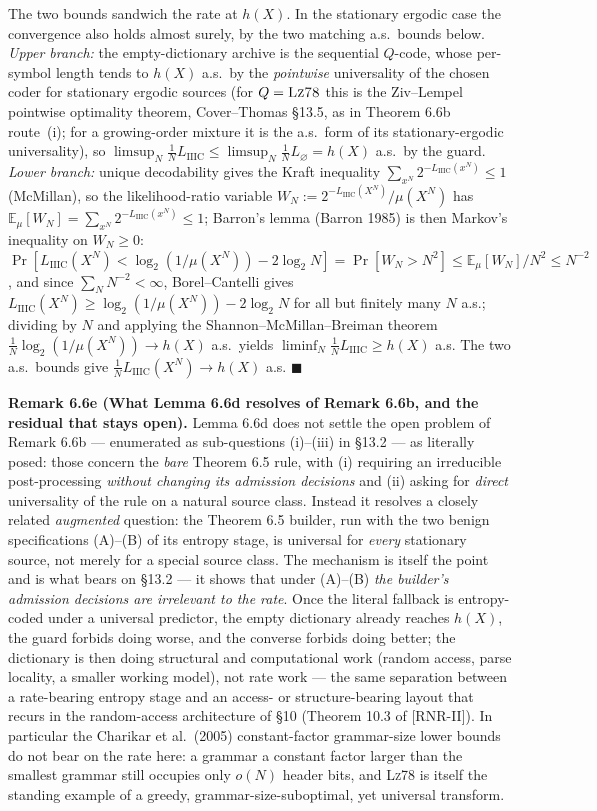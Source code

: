 \documentclass[
]{article}
\begin{document}
The two bounds sandwich the rate at $h(X)$. In the stationary ergodic
case the convergence also holds almost surely, by the two matching a.s.\
bounds below. \emph{Upper branch:} the empty-dictionary archive is the
sequential $Q$-code, whose per-symbol length tends to $h(X)$ a.s.\ by the
\emph{pointwise} universality of the chosen coder for stationary ergodic
sources (for $Q = \textsc{Lz78}$ this is the Ziv--Lempel pointwise
optimality theorem, Cover--Thomas \S13.5, as in Theorem 6.6b route~(i);
for a growing-order mixture it is the a.s.\ form of its
stationary-ergodic universality),
so $\limsup_N \tfrac1N L_{\mathrm{IIIC}} \le \limsup_N \tfrac1N
L_\varnothing = h(X)$ a.s.\ by the guard. \emph{Lower branch:} unique
decodability gives the Kraft inequality $\sum_{x^N}
2^{-L_{\mathrm{IIIC}}(x^N)} \le 1$ (McMillan), so the likelihood-ratio
variable $W_N := 2^{-L_{\mathrm{IIIC}}(X^N)}/\mu(X^N)$ has
$\mathbb{E}_\mu[W_N] = \sum_{x^N} 2^{-L_{\mathrm{IIIC}}(x^N)} \le 1$;
Barron's lemma (Barron 1985) is then Markov's inequality on $W_N \ge 0$:
$\Pr[L_{\mathrm{IIIC}}(X^N) < \log_2(1/\mu(X^N)) - 2\log_2 N] =
\Pr[W_N > N^2] \le \mathbb{E}_\mu[W_N]/N^2 \le N^{-2}$, and since
$\sum_N N^{-2} < \infty$, Borel--Cantelli gives $L_{\mathrm{IIIC}}(X^N)
\ge \log_2(1/\mu(X^N)) - 2\log_2 N$ for all but finitely many $N$ a.s.;
dividing by $N$ and applying the Shannon--McMillan--Breiman theorem
$\tfrac1N \log_2(1/\mu(X^N)) \to h(X)$ a.s.\ yields $\liminf_N \tfrac1N
L_{\mathrm{IIIC}} \ge h(X)$ a.s. The two a.s.\ bounds give $\tfrac1N
L_{\mathrm{IIIC}}(X^N) \to h(X)$ a.s. \hfill$\blacksquare$

\textbf{Remark 6.6e (What Lemma 6.6d resolves of Remark 6.6b, and the
residual that stays open).} Lemma 6.6d does not settle the
open problem of Remark 6.6b --- enumerated as sub-questions (i)--(iii) in
\S13.2 --- as literally posed: those concern the \emph{bare} Theorem 6.5
rule, with (i) requiring an irreducible post-processing \emph{without
changing its admission decisions} and (ii) asking for \emph{direct}
universality of the rule on a natural source class. Instead it resolves a
closely related \emph{augmented} question: the Theorem 6.5 builder, run
with the two benign specifications (A)--(B) of its entropy stage, is
universal for \emph{every} stationary source, not merely for a special
source class. The mechanism is itself the point and is what bears on
\S13.2 --- it shows that under (A)--(B) \emph{the builder's admission
decisions are irrelevant to the rate}. Once the literal fallback is entropy-coded under a universal
predictor, the empty dictionary already reaches $h(X)$, the guard forbids
doing worse, and the converse forbids doing better; the dictionary is
then doing structural and computational work (random access, parse
locality, a smaller working model), not rate work --- the same separation
between a rate-bearing entropy stage and an access- or structure-bearing
layout that recurs in the random-access architecture of \S10
(Theorem 10.3 of [RNR-II]). In particular the
Charikar et al.\ (2005) constant-factor grammar-size lower bounds do not
bear on the rate here: a grammar a constant factor larger than the
smallest grammar still occupies only $o(N)$ header bits, and \textsc{Lz78}
is itself the standing example of a greedy, grammar-size-suboptimal, yet
universal transform.
\end{document}
